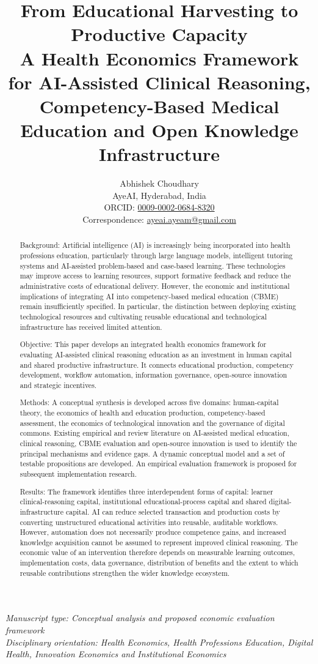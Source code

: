 \documentclass[11pt,a4paper]{article}
\title{\textbf{From Educational Harvesting to Productive Capacity}\\[0.5em]\large A Health Economics Framework for AI-Assisted Clinical Reasoning, Competency-Based Medical Education and Open Knowledge Infrastructure}
\author{Abhishek Choudhary\\[0.35em]\normalsize AyeAI, Hyderabad, India\\\normalsize ORCID: \href{https://orcid.org/0009-0002-0684-8320}{0009-0002-0684-8320}\\\normalsize Correspondence: \href{mailto:ayeai.ayeam@gmail.com}{ayeai.ayeam@gmail.com}}
\date{}
\begin{document}
\maketitle
\noindent\textit{Manuscript type: Conceptual analysis and proposed economic evaluation framework\\Disciplinary orientation: Health Economics, Health Professions Education, Digital Health, Innovation Economics and Institutional Economics}
\begin{abstract}
Background: Artificial intelligence (AI) is increasingly being incorporated into health professions education, particularly through large language models, intelligent tutoring systems and AI-assisted problem-based and case-based learning. These technologies may improve access to learning resources, support formative feedback and reduce the administrative costs of educational delivery. However, the economic and institutional implications of integrating AI into competency-based medical education (CBME) remain insufficiently specified. In particular, the distinction between deploying existing technological resources and cultivating reusable educational and technological infrastructure has received limited attention.

Objective: This paper develops an integrated health economics framework for evaluating AI-assisted clinical reasoning education as an investment in human capital and shared productive infrastructure. It connects educational production, competency development, workflow automation, information governance, open-source innovation and strategic incentives.

Methods: A conceptual synthesis is developed across five domains: human-capital theory, the economics of health and education production, competency-based assessment, the economics of technological innovation and the governance of digital commons. Existing empirical and review literature on AI-assisted medical education, clinical reasoning, CBME evaluation and open-source innovation is used to identify the principal mechanisms and evidence gaps. A dynamic conceptual model and a set of testable propositions are developed. An empirical evaluation framework is proposed for subsequent implementation research.

Results: The framework identifies three interdependent forms of capital: learner clinical-reasoning capital, institutional educational-process capital and shared digital-infrastructure capital. AI can reduce selected transaction and production costs by converting unstructured educational activities into reusable, auditable workflows. However, automation does not necessarily produce competence gains, and increased knowledge acquisition cannot be assumed to represent improved clinical reasoning. The economic value of an intervention therefore depends on measurable learning outcomes, implementation costs, data governance, distribution of benefits and the extent to which reusable contributions strengthen the wider knowledge ecosystem.


\end{abstract}
\end{document}
